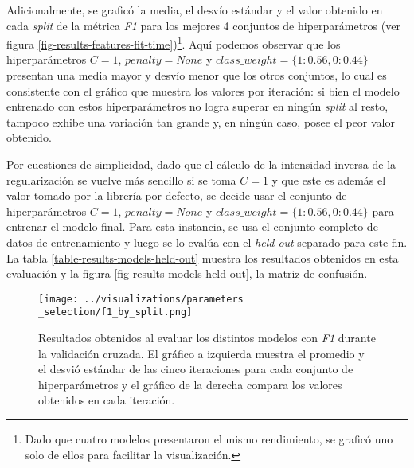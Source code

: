 Adicionalmente, se grafic\'o la media, el desv\'io est\'andar y el valor
obtenido en cada \textit{split} de la m\'etrica \textit{F1}
para los mejores 4 conjuntos de hiperpar\'ametros
(ver figura \ref{fig-results-features-fit-time})\footnote{Dado
que cuatro modelos presentaron el mismo rendimiento, se grafic\'o uno solo
de ellos para facilitar la visualizaci\'on.}.
Aqu\'i podemos observar que los hiperpar\'ametros $C=1$, $penalty=None$
y $class\_weight=\lbrace1:0.56,0:0.44\rbrace$
presentan una media mayor y desv\'io menor que los otros
conjuntos, lo cual es consistente con el gr\'afico que muestra
los valores por iteraci\'on: si bien el modelo entrenado con estos hiperpar\'ametros
no logra superar en ning\'un \textit{split} al resto, tampoco exhibe
una variaci\'on tan grande y, en ning\'un caso, posee el peor valor
obtenido.
\par
Por cuestiones de simplicidad, dado que el c\'alculo de la intensidad inversa
de la regularizaci\'on se vuelve m\'as sencillo si se toma $C=1$ y que este es
adem\'as el valor tomado por la librería por defecto, se decide usar el conjunto
de hiperparámetros $C=1$, $penalty=None$ y
$class\_weight=\lbrace1:0.56,0:0.44\rbrace$ para entrenar el modelo final.
Para esta instancia, se usa el conjunto completo de datos de entrenamiento y luego
se lo eval\'ua con el \textit{held-out} separado para este fin. La tabla
\ref{table-results-models-held-out} muestra los resultados obtenidos en
esta evaluaci\'on y la figura \ref{fig-results-models-held-out}, la matriz
de confusi\'on.

\begin{figure}[h!]
    \centering
    \texttt{[image: ../visualizations/parameters\\\_selection/f1\_by\_split.png]}
    \caption{Resultados obtenidos al evaluar los distintos modelos con
    \textit{F1} durante la validaci\'on cruzada. El gr\'afico a izquierda muestra el
    promedio y el desvi\'o est\'andar de las cinco iteraciones para cada conjunto
    de hiperpar\'ametros y el gr\'afico de la derecha compara los valores obtenidos en
    cada iteraci\'on.}
    \label{fig-results-models-f1}
\end{figure}

